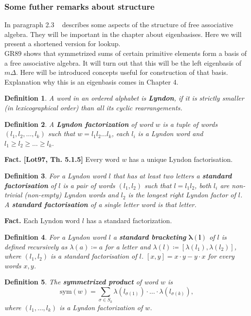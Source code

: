 \documentclass[a4paper, 12pt]{article}
\newtheorem{definition}{Definition}
\begin{document}
\subsubsection{Some futher remarks about structure}
In paragraph 2.3 ~\cite{Diaconis2014} describes some aspects of the structure of free associative algebra.
They will be important in the chapter about eigenbasises. Here we will present a shortened version for
 lookup.
 \\
GR89 shows that symmetrized sums of certain primitive elements form a basis of a free associative algebra.
It will turn out that this will be the left eigenbasis of $m\Delta$.
Here will be introduced concepts useful for
construction of that basis. Explanation why this is an eigenbasis comes in Chapter 4.
\begin{definition}
A word in an ordered alphabet is \textbf{Lyndon}, if it is strictly smaller (in lexicographical order)
 than all its cyclic rearrangements.
\end{definition}
\begin{definition}
A \textbf{Lyndon factorization} of word $w$ is a tuple of words $(l_1, l_2, \dots, l_k)$ such that
$w = l_1l_2\dots l_k$, each $l_i$ is a Lyndon word and $l_1 \geq l_2 \geq \dots \geq l_k$.
\end{definition}
\noindent\textbf{Fact. [Lot97, Th. 5.1.5]} Every word $w$ has a unique Lyndon factorisation.
\begin{definition}
For a Lyndon word $l$ that has at least two letters a \textbf{standard factorisation} of $l$ is a pair of
words $(l_1, l_2)$ such that $l = l_1l_2$, both $l_i$ are non-trivial (non-empty) Lyndon words and $l_2$
is the longest right Lyndon factor of $l$. A \textbf{standard factorisation} of a single letter word is that
letter.
\end{definition}
\noindent\textbf{Fact.} Each Lyndon word $l$ has a standard factorization.
\begin{definition}
For a Lyndon word $l$ a \textbf{standard bracketing} $\boldsymbol{\lambda(l)}$ of $l$ is defined recursively
as
$\lambda(a) \coloneqq a$ for a letter and $\lambda(l) \coloneqq [\lambda(l_1), \lambda(l_2)]$, where $(l_1,
l_2)$
is a standard factorisation of $l$. $[x, y] = x\cdot y - y\cdot x$ for every words $x, y$.
\end{definition}
\begin{definition}
The \textbf{symmetrized product} of word $w$ is
\begin{equation*}
\mathrm{sym}(w) = \sum_{\sigma \in S_k} \lambda(l_{\sigma(1)})\cdot\ldots\cdot\lambda(l_{\sigma(k)}),
\end{equation*}
where $(l_1, \dots, l_k)$ is a Lyndon factorization of $w$.
\end{definition}
\end{document}
